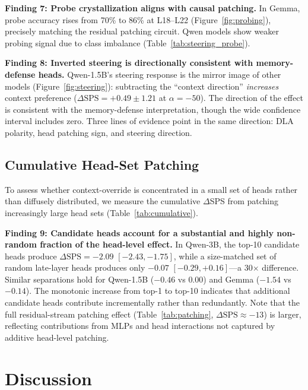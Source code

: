 \documentclass{article}
\begin{document}


\textbf{Finding 7: Probe crystallization aligns with causal patching.} In Gemma, probe accuracy rises from 70\% to 86\% at L18--L22 (Figure~\ref{fig:probing}), precisely matching the residual patching circuit. Qwen models show weaker probing signal due to class imbalance (Table~\ref{tab:steering_probe}).

\textbf{Finding 8: Inverted steering is directionally consistent with memory-defense heads.} Qwen-1.5B's steering response is the mirror image of other models (Figure~\ref{fig:steering}): subtracting the ``context direction'' \emph{increases} context preference ($\Delta\text{SPS} = +0.49 \pm 1.21$ at $\alpha{=}{-}50$). The direction of the effect is consistent with the memory-defense interpretation, though the wide confidence interval includes zero. Three lines of evidence point in the same direction: DLA polarity, head patching sign, and steering direction.

\subsection{Cumulative Head-Set Patching}

To assess whether context-override is concentrated in a small set of heads rather than diffusely distributed, we measure the cumulative $\Delta$SPS from patching increasingly large head sets (Table~\ref{tab:cumulative}).



\textbf{Finding 9: Candidate heads account for a substantial and highly non-random fraction of the head-level effect.} In Qwen-3B, the top-10 candidate heads produce $\Delta\text{SPS} = -2.09$ $[-2.43, -1.75]$, while a size-matched set of random late-layer heads produces only $-0.07$ $[-0.29, +0.16]$---a 30$\times$ difference. Similar separations hold for Qwen-1.5B ($-0.46$ vs $0.00$) and Gemma ($-1.54$ vs $-0.14$). The monotonic increase from top-1 to top-10 indicates that additional candidate heads contribute incrementally rather than redundantly. Note that the full residual-stream patching effect (Table~\ref{tab:patching}, $\Delta\text{SPS} \approx -13$) is larger, reflecting contributions from MLPs and head interactions not captured by additive head-level patching.

\section{Discussion}
\label{sec:discussion}
\end{document}
